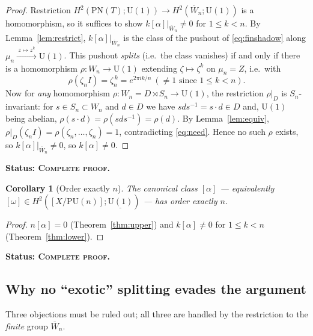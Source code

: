 \documentclass[11pt]{article}
\newtheorem{corollary}[theorem]{Corollary}
\theoremstyle{definition}
\newcommand{\U}{\mathrm{U}}
\newcommand{\PU}{\mathrm{PU}}
\newcommand{\PN}{\mathrm{PN}}
\newcommand{\Wn}{\overline{W}_{n}}
\newcommand{\STAT}[1]{\noindent\textbf{Status: #1}}
\newcommand{\COMPLETE}{\textsc{Complete proof}}
\begin{document}
\begin{proof}
Restriction $H^2(\PN(T);\U(1))\to H^2(\Wn;\U(1))$ is a homomorphism, so it suffices to show
$k[\alpha]|_{\Wn}\neq0$ for $1\le k<n$. By Lemma~\ref{lem:restrict}, $k[\alpha]|_{\Wn}$ is
the class of the pushout of \eqref{eq:finshadow} along $\mu_n\xrightarrow{\ z\mapsto z^{k}\ }
\U(1)$. This pushout \emph{splits} (i.e.\ the class vanishes) if and only if there is a
homomorphism $\rho\colon W_n\to\U(1)$ extending $\zeta\mapsto\zeta^{k}$ on
$\mu_n=Z$, i.e.\ with
\begin{equation}\label{eq:need}
\rho(\zeta_n I)=\zeta_n^{\,k}=e^{2\pi i k/n}\ (\neq 1\text{ since }1\le k<n).
\end{equation}
Now for \emph{any} homomorphism $\rho\colon W_n=D\rtimes S_n\to\U(1)$, the restriction
$\rho|_{D}$ is $S_n$-invariant: for $s\in S_n\subset W_n$ and $d\in D$ we have
$s d s^{-1}=s\cdot d\in D$ and, $\U(1)$ being abelian,
$\rho(s\cdot d)=\rho(sds^{-1})=\rho(d)$. By Lemma~\ref{lem:equiv},
$\rho|_D(\zeta_n I)=\rho(\zeta_n,\dots,\zeta_n)=1$, contradicting \eqref{eq:need}. Hence no
such $\rho$ exists, so $k[\alpha]|_{\Wn}\neq0$, so $k[\alpha]\neq0$.
\end{proof}
\STAT{\COMPLETE.}

\begin{corollary}[Order exactly $n$]\label{thm:order}
The canonical class $[\alpha]$ --- equivalently $[\omega]\in H^2([X/\PU(n)];\underline{\U(1)})$
--- has order exactly $n$.
\end{corollary}
\begin{proof}
$n[\alpha]=0$ (Theorem~\ref{thm:upper}) and $k[\alpha]\neq0$ for $1\le k<n$
(Theorem~\ref{thm:lower}).
\end{proof}
\STAT{\COMPLETE.}

\subsection{Why no ``exotic'' splitting evades the argument}\label{ssec:exotic}

Three objections must be ruled out; all three are handled by the restriction to the
\emph{finite} group $\Wn$.
\end{document}
